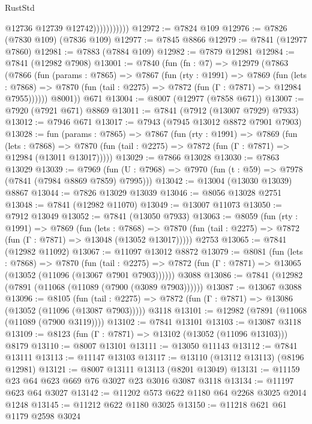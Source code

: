 \begin{lexlean}{RustStd}
\begin{coremodule}
                          @12736
                          @12739
                          @12742)))))))))))
@12972 := @7824 @109
@12976 := @7826 (@7830 @109) (@7836 @109)
@12977 := @7845 @8866
@12979 := @7841 (@12977 @7860)
@12981 := @7883 (@7884 @109)
@12982 := @7879 @12981
@12984 := @7841 (@12982 @7908)
@13001 := @7840
    (fun (fn : @7) =>
    @12979
      (@7863
        (@7866
          (fun (params : @7865) =>
          @7867
            (fun (rty : @1991) =>
            @7869
              (fun (lets : @7868) =>
              @7870 (fun (tail : @2275) => @7872 (fun (Γ : @7871) => @12984 @7955))))))
        @8001))
    @671
@13004 := @8007 (@12977 (@7858 @671))
@13007 := @7920 (@7921 @671) @8869
@13011 := @7841 (@7912 (@13007 @7929) @7933)
@13012 := @7946 @671
@13017 := @7943 (@7945 @13012 @8872 @7901 @7903)
@13028 := fun (params : @7865) =>
  @7867
    (fun (rty : @1991) =>
    @7869
      (fun (lets : @7868) =>
      @7870 (fun (tail : @2275) => @7872 (fun (Γ : @7871) => @12984 (@13011 @13017)))))
@13029 := @7866 @13028
@13030 := @7863 @13029
@13039 := @7969
    (fun (U : @7968) => @7970 (fun (t : @59) => @7978 (@7841 (@7984 @8869 @7859) @7995)))
@13042 := @13004 (@13030 @13039) @8867
@13044 := @7826 @13029 @13039
@13046 := @8056 @13028 @2751
@13048 := @7841 (@12982 @11070)
@13049 := @13007 @11073
@13050 := @7912 @13049
@13052 := @7841 (@13050 @7933)
@13063 := @8059
    (fun (rty : @1991) =>
    @7869
      (fun (lets : @7868) =>
      @7870 (fun (tail : @2275) => @7872 (fun (Γ : @7871) => @13048 (@13052 @13017)))))
    @2753
@13065 := @7841 (@12982 @11092)
@13067 := @11097 @13012 @8872
@13079 := @8081
    (fun (lets : @7868) =>
    @7870
      (fun (tail : @2275) =>
      @7872 (fun (Γ : @7871) => @13065 (@13052 (@11096 (@13067 @7901 @7903))))))
    @3088
@13086 := @7841 (@12982 (@7891 (@11068 (@11089 (@7900 (@3089 @7903))))))
@13087 := @13067 @3088
@13096 := @8105
    (fun (tail : @2275) => @7872 (fun (Γ : @7871) => @13086 (@13052 (@11096 (@13087 @7903)))))
    @3118
@13101 := @12982 (@7891 (@11068 (@11089 (@7900 @3119))))
@13102 := @7841 @13101
@13103 := @13087 @3118
@13109 := @8123 (fun (Γ : @7871) => @13102 (@13052 (@11096 @13103))) @8179
@13110 := @8007 @13101
@13111 := @13050 @11143
@13112 := @7841 @13111
@13113 := @11147 @13103
@13117 := @13110 (@13112 @13113) (@8196 @12981)
@13121 := @8007 @13111 @13113 (@8201 @13049)
@13131 := @11159 @23 @64 @623 @669 @76 @3027 @23 @3016 @3087 @3118
@13134 := @11197 @623 @64 @3027
@13142 := @11202 @573 @622 @1180 @64 @2268 @3025 @2014 @1248
@13145 := @11212 @622 @1180 @3025
@13150 := @11218 @621 @61 @1179 @2598 @3024

\end{coremodule}
\end{lexlean}
